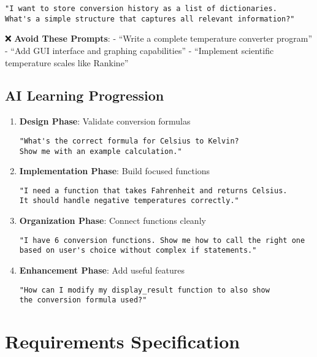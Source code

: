 \documentclass[
  letterpaper,
  DIV=11,
  numbers=noendperiod,
  oneside]{scrreprt}
\begin{document}
\begin{verbatim}
"I want to store conversion history as a list of dictionaries. 
What's a simple structure that captures all relevant information?"
\end{verbatim}

❌ \textbf{Avoid These Prompts}: - ``Write a complete temperature
converter program'' - ``Add GUI interface and graphing capabilities'' -
``Implement scientific temperature scales like Rankine''

\subsection{AI Learning Progression}\label{ai-learning-progression-4}

\begin{enumerate}
\def\labelenumi{\arabic{enumi}.}
\item
  \textbf{Design Phase}: Validate conversion formulas

\begin{verbatim}
"What's the correct formula for Celsius to Kelvin? 
Show me with an example calculation."
\end{verbatim}
\item
  \textbf{Implementation Phase}: Build focused functions

\begin{verbatim}
"I need a function that takes Fahrenheit and returns Celsius. 
It should handle negative temperatures correctly."
\end{verbatim}
\item
  \textbf{Organization Phase}: Connect functions cleanly

\begin{verbatim}
"I have 6 conversion functions. Show me how to call the right one 
based on user's choice without complex if statements."
\end{verbatim}
\item
  \textbf{Enhancement Phase}: Add useful features

\begin{verbatim}
"How can I modify my display_result function to also show 
the conversion formula used?"
\end{verbatim}
\end{enumerate}

\section{Requirements Specification}\label{requirements-specification-4}
\end{document}
